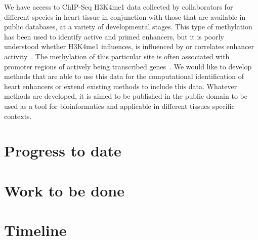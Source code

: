 \documentclass[12pt,a4paper]{article}
\begin{document}
        We have access to ChIP-Seq H3K4me1 data collected by collaborators for different species in heart tissue in conjunction with those that are available in public databases, at a variety of developmental stages. This type of methylation has been used to identify active and primed enhancers, but it is poorly understood whether H3K4me1 influences, is influenced by or correlates enhancer activity~\cite{rada2018h3k4me1}. The methylation of this particular site is often associated with promoter regions of actively being transcribed genes~\cite{barski2007high}. We would like to develop methods that are able to use this data for the computational identification of heart enhancers or extend existing methods to include this data. Whatever methods are developed, it is aimed to be published in the public domain to be used as a tool for bioinformatics and applicable in different tissues specific contexts.  
        
    \section{Progress to date}
    
    
    \section{Work to be done}
    
    
    
    \newpage
    \section{Timeline}
\end{document}
